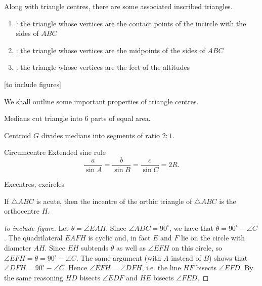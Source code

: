 Along with triangle centres, there are some associated inscribed triangles.

\begin{enumerate}
\item {}: the triangle whose vertices are the contact points of the incircle with the sides of $ABC$
\item {}: the triangle whose vertices are the midpoints of the sides of $ABC$
\item {}: the triangle whose vertices are the feet of the altitudes
\end{enumerate}

[to include figures]

We shall outline some important properties of triangle centres.

\begin{proposition}
Medians cut triangle into 6 parts of equal area.
\end{proposition}

\begin{proposition}
Centroid $G$ divides medians into segments of ratio $2:1$.
\end{proposition}

\begin{proposition}
Circumcentre
Extended sine rule
\[ \frac{a}{\sin A}=\frac{b}{\sin B}=\frac{c}{\sin C}=2R. \]
\end{proposition}

\begin{proposition}
Excentres, excircles
\end{proposition}

\begin{proposition}
If $\triangle ABC$ is acute, then the incentre of the orthic triangle of $\triangle ABC$ is the orthocentre $H$.
\end{proposition}

\begin{proof}
[to include figure]

Let $\theta = \angle EAH$. Since $\angle ADC = 90^\circ$, we have that $\theta = 90^\circ-\angle C$. The quadrilateral $EAFH$ is cyclic and, in fact $E$ and $F$ lie on the circle with diameter $AH$. Since $EH$ subtends $\theta$ as well as $\angle EFH$ on this circle, so $\angle EFH = \theta = 90^\circ-\angle C$. The same argument (with $A$ instead of $B$) shows that $\angle DFH = 90^\circ-\angle C$. Hence $\angle EFH = \angle DFH$, i.e. the line $HF$ bisects $\angle EFD$. By the same reasoning $HD$ bisects $\angle EDF$ and $HE$ bisects $\angle FED$.
\end{proof}

